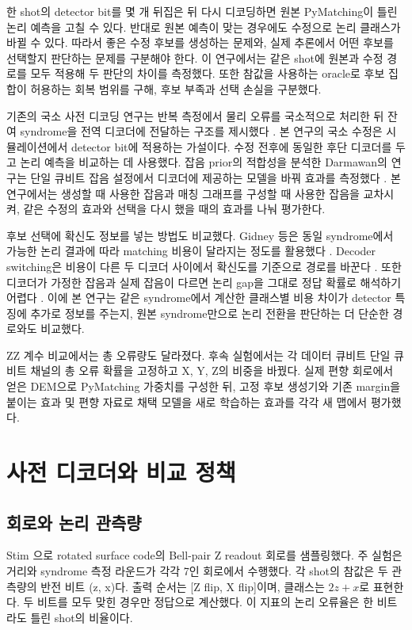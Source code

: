 \documentclass[aps,prd,12pt,twocolumn,superscriptaddress,floatfix]{revtex4-2}
\begin{document}
한 shot의 detector bit를 몇 개 뒤집은 뒤 다시 디코딩하면 원본 PyMatching이 틀린 논리 예측을 고칠 수 있다. 반대로 원본 예측이 맞는 경우에도 수정으로 논리 클래스가 바뀔 수 있다. 따라서 좋은 수정 후보를 생성하는 문제와, 실제 추론에서 어떤 후보를 선택할지 판단하는 문제를 구분해야 한다. 이 연구에서는 같은 shot에 원본과 수정 경로를 모두 적용해 두 판단의 차이를 측정했다. 또한 참값을 사용하는 oracle로 후보 집합이 허용하는 회복 범위를 구해, 후보 부족과 선택 손실을 구분했다.

기존의 국소 사전 디코딩 연구는 반복 측정에서 물리 오류를 국소적으로 처리한 뒤 잔여 syndrome을 전역 디코더에 전달하는 구조를 제시했다 \cite{chamberland2026}. 본 연구의 국소 수정은 시뮬레이션에서 detector bit에 적용하는 가설이다. 수정 전후에 동일한 후단 디코더를 두고 논리 예측을 비교하는 데 사용했다. 잡음 prior의 적합성을 분석한 Darmawan의 연구는 단일 큐비트 잡음 설정에서 디코더에 제공하는 모델을 바꿔 효과를 측정했다 \cite{darmawan2024}. 본 연구에서는 생성할 때 사용한 잡음과 매칭 그래프를 구성할 때 사용한 잡음을 교차시켜, 같은 수정의 효과와 선택을 다시 했을 때의 효과를 나눠 평가한다.

후보 선택에 확신도 정보를 넣는 방법도 비교했다. Gidney 등은 동일 syndrome에서 가능한 논리 결과에 따라 matching 비용이 달라지는 정도를 활용했다 \cite{yoked2025}. Decoder switching은 비용이 다른 두 디코더 사이에서 확신도를 기준으로 경로를 바꾼다 \cite{toshio2025}. 또한 디코더가 가정한 잡음과 실제 잡음이 다르면 논리 gap을 그대로 정답 확률로 해석하기 어렵다 \cite{hoyt2026}. 이에 본 연구는 같은 syndrome에서 계산한 클래스별 비용 차이가 detector 특징에 추가로 정보를 주는지, 원본 syndrome만으로 논리 전환을 판단하는 더 단순한 경로와도 비교했다.

ZZ 계수 비교에서는 총 오류량도 달라졌다. 후속 실험에서는 각 데이터 큐비트 단일 큐비트 채널의 총 오류 확률을 고정하고 X, Y, Z의 비중을 바꿨다. 실제 편향 회로에서 얻은 DEM으로 PyMatching 가중치를 구성한 뒤, 고정 후보 생성기와 기존 margin을 붙이는 효과 및 편향 자료로 채택 모델을 새로 학습하는 효과를 각각 새 맵에서 평가했다.

\section{사전 디코더와 비교 정책}

\subsection{회로와 논리 관측량}

Stim \cite{stim2021}으로 rotated surface code의 Bell-pair Z readout 회로를 샘플링했다. 주 실험은 거리와 syndrome 측정 라운드가 각각 7인 회로에서 수행했다. 각 shot의 참값은 두 관측량의 반전 비트 (z, x)다. 출력 순서는 [Z flip, X flip]이며, 클래스는 \(2z + x\)로 표현한다. 두 비트를 모두 맞힌 경우만 정답으로 계산했다. 이 지표의 논리 오류율은 한 비트라도 틀린 shot의 비율이다.
\end{document}
